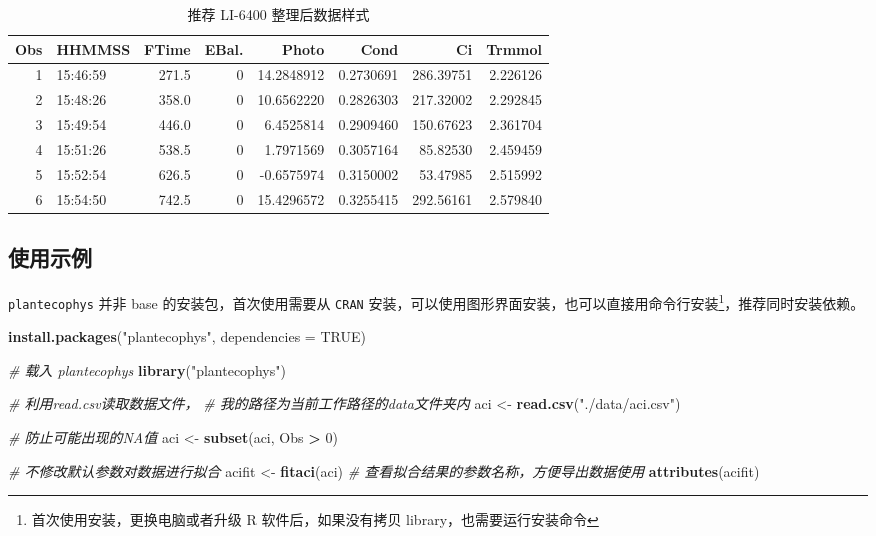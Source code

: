 \documentclass[]{krantz}
\makeatletter
\newenvironment{Shaded}{\begin{snugshade}}{\end{snugshade}}
\newcommand{\KeywordTok}[1]{\textcolor[rgb]{0.13,0.29,0.53}{\textbf{#1}}}
\newcommand{\DataTypeTok}[1]{\textcolor[rgb]{0.13,0.29,0.53}{#1}}
\newcommand{\DecValTok}[1]{\textcolor[rgb]{0.00,0.00,0.81}{#1}}
\newcommand{\StringTok}[1]{\textcolor[rgb]{0.31,0.60,0.02}{#1}}
\newcommand{\CommentTok}[1]{\textcolor[rgb]{0.56,0.35,0.01}{\textit{#1}}}
\newcommand{\OtherTok}[1]{\textcolor[rgb]{0.56,0.35,0.01}{#1}}
\newcommand{\OperatorTok}[1]{\textcolor[rgb]{0.81,0.36,0.00}{\textbf{#1}}}
\newcommand{\NormalTok}[1]{#1}
\newenvironment{kframe}{%
\medskip{}
\setlength{\fboxsep}{.8em}
 \def\at@end@of@kframe{}%
 \ifinner\ifhmode%
  \def\at@end@of@kframe{\end{minipage}}%
  \begin{minipage}{\columnwidth}%
 \fi\fi%
 \def\FrameCommand##1{\hskip\@totalleftmargin \hskip-\fboxsep
 \colorbox{shadecolor}{##1}\hskip-\fboxsep
     \hskip-\linewidth \hskip-\@totalleftmargin \hskip\columnwidth}%
 \MakeFramed {\advance\hsize-\width
   \@totalleftmargin\z@ \linewidth\hsize
   \@setminipage}}%
 {\par\unskip\endMakeFramed%
 \at@end@of@kframe}
\renewenvironment{Shaded}{\begin{kframe}}{\end{kframe}}
\theoremstyle{definition}
\theoremstyle{definition}
\theoremstyle{definition}
\theoremstyle{remark}
\makeatother
\begin{document}
\begin{longtable}[t]{rlrrrrrr}
\caption{\label{tab:head6400}推荐 LI-6400 整理后数据样式}\\
\toprule
Obs & HHMMSS & FTime & EBal. & Photo & Cond & Ci & Trmmol\\
\midrule
1 & 15:46:59 & 271.5 & 0 & 14.2848912 & 0.2730691 & 286.39751 & 2.226126\\
2 & 15:48:26 & 358.0 & 0 & 10.6562220 & 0.2826303 & 217.32002 & 2.292845\\
3 & 15:49:54 & 446.0 & 0 & 6.4525814 & 0.2909460 & 150.67623 & 2.361704\\
4 & 15:51:26 & 538.5 & 0 & 1.7971569 & 0.3057164 & 85.82530 & 2.459459\\
5 & 15:52:54 & 626.5 & 0 & -0.6575974 & 0.3150002 & 53.47985 & 2.515992\\
6 & 15:54:50 & 742.5 & 0 & 15.4296572 & 0.3255415 & 292.56161 & 2.579840\\
\bottomrule
\end{longtable}

\subsection{使用示例}\label{fitaci-p}

\texttt{plantecophys} 并非 base 的安装包，首次使用需要从 \texttt{CRAN}
安装，可以使用图形界面安装，也可以直接用命令行安装\footnote{首次使用安装，更换电脑或者升级
  R 软件后，如果没有拷贝 library，也需要运行安装命令}，推荐同时安装依赖。

\begin{Shaded}
\begin{Highlighting}[]
\KeywordTok{install.packages}\NormalTok{(}\StringTok{"plantecophys"}\NormalTok{, }\DataTypeTok{dependencies =} \OtherTok{TRUE}\NormalTok{)}
\end{Highlighting}
\end{Shaded}

\begin{Shaded}
\begin{Highlighting}[]
\CommentTok{# 载入 plantecophys }
\KeywordTok{library}\NormalTok{(}\StringTok{"plantecophys"}\NormalTok{)}

\CommentTok{# 利用read.csv读取数据文件，}
\CommentTok{# 我的路径为当前工作路径的data文件夹内}
\NormalTok{aci <-}\StringTok{ }\KeywordTok{read.csv}\NormalTok{(}\StringTok{"./data/aci.csv"}\NormalTok{)}

\CommentTok{# 防止可能出现的NA值}
\NormalTok{aci <-}\StringTok{ }\KeywordTok{subset}\NormalTok{(aci, Obs }\OperatorTok{>}\StringTok{ }\DecValTok{0}\NormalTok{)}

\CommentTok{# 不修改默认参数对数据进行拟合}
\NormalTok{acifit <-}\StringTok{ }\KeywordTok{fitaci}\NormalTok{(aci)}
\CommentTok{# 查看拟合结果的参数名称，方便导出数据使用}
\KeywordTok{attributes}\NormalTok{(acifit)}
\end{Highlighting}
\end{Shaded}
\end{document}
